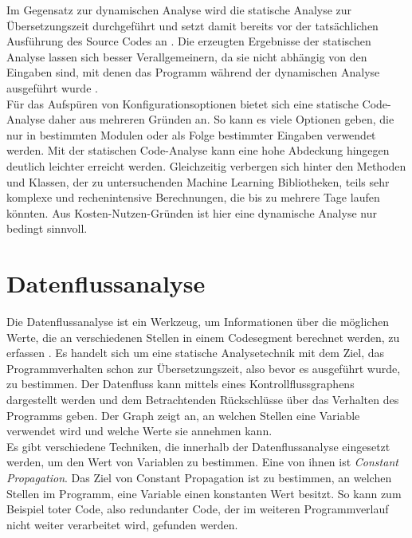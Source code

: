 \documentclass[german,bachelor]{swsLeipzig}
\begin{document}
Im Gegensatz zur dynamischen Analyse wird die statische Analyse zur Übersetzungszeit durchgeführt
und setzt damit bereits vor der tatsächlichen Ausführung des Source Codes an \cite[]{gomes2009overview}.
Die erzeugten Ergebnisse der statischen Analyse lassen sich besser Verallgemeinern, da sie nicht abhängig von den Eingaben sind,
mit denen das Programm während der dynamischen Analyse ausgeführt wurde \cite[]{gomes2009overview}.\\

Für das Aufspüren von Konfigurationsoptionen bietet sich eine statische Code-Analyse daher aus mehreren Gründen an.
So kann es viele Optionen geben, die nur in bestimmten Modulen oder als Folge bestimmter Eingaben verwendet werden.
Mit der statischen Code-Analyse kann eine hohe Abdeckung hingegen deutlich leichter erreicht werden.
Gleichzeitig verbergen sich hinter den Methoden und Klassen, der zu untersuchenden Machine Learning Bibliotheken,
teils sehr komplexe und rechenintensive Berechnungen, die bis zu mehrere Tage laufen könnten.
Aus Kosten-Nutzen-Gründen ist hier eine dynamische Analyse nur bedingt sinnvoll.\\

\section{Datenflussanalyse}
Die Datenflussanalyse ist ein Werkzeug, um Informationen über die möglichen Werte, die an verschiedenen
Stellen in einem Codesegment berechnet werden, zu erfassen \cite[]{58766}.
Es handelt sich um eine statische Analysetechnik mit dem Ziel, das Programmverhalten schon zur Übersetzungszeit,
also bevor es ausgeführt wurde, zu bestimmen.
Der Datenfluss kann mittels eines Kontrollflussgraphens dargestellt werden und dem Betrachtenden
Rückschlüsse über das Verhalten des Programms geben.
Der Graph zeigt an, an welchen Stellen eine Variable verwendet wird und welche Werte sie annehmen kann.\\

Es gibt verschiedene Techniken, die innerhalb der Datenflussanalyse eingesetzt werden, um den Wert von Variablen zu bestimmen.
Eine von ihnen ist \textit{Constant Propagation}.
Das Ziel von Constant Propagation ist zu bestimmen, an welchen Stellen im Programm, eine Variable einen konstanten Wert besitzt.
So kann zum Beispiel toter Code, also redundanter Code, der im weiteren Programmverlauf nicht weiter verarbeitet wird, gefunden werden.\\
\end{document}
